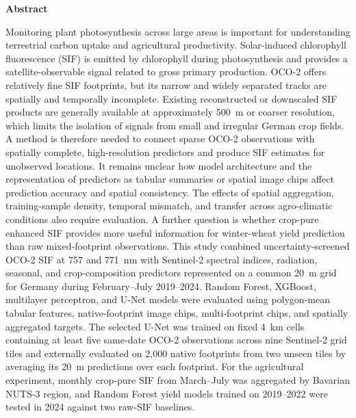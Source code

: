 \thispagestyle{empty}
\vspace*{1.0cm}

\begin{center}
    \textbf{Abstract}
\end{center}

\vspace*{0.5cm}

\noindent
Monitoring plant photosynthesis across large areas is important for understanding terrestrial carbon uptake and agricultural productivity.
Solar-induced chlorophyll fluorescence (SIF) is emitted by chlorophyll during photosynthesis and provides a satellite-observable signal related to gross primary production.
OCO-2 offers relatively fine SIF footprints, but its narrow and widely separated tracks are spatially and temporally incomplete.
Existing reconstructed or downscaled SIF products are generally available at approximately 500~m or coarser resolution, which limits the isolation of signals from small and irregular German crop fields.
A method is therefore needed to connect sparse OCO-2 observations with spatially complete, high-resolution predictors and produce SIF estimates for unobserved locations.
It remains unclear how model architecture and the representation of predictors as tabular summaries or spatial image chips affect prediction accuracy and spatial consistency.
The effects of spatial aggregation, training-sample density, temporal mismatch, and transfer across agro-climatic conditions also require evaluation.
A further question is whether crop-pure enhanced SIF provides more useful information for winter-wheat yield prediction than raw mixed-footprint observations.
This study combined uncertainty-screened OCO-2 SIF at 757 and 771~nm with Sentinel-2 spectral indices, radiation, seasonal, and crop-composition predictors represented on a common 20~m grid for Germany during February--July 2019--2024.
Random Forest, XGBoost, multilayer perceptron, and U-Net models were evaluated using polygon-mean tabular features, native-footprint image chips, multi-footprint chips, and spatially aggregated targets.
The selected U-Net was trained on fixed 4~km cells containing at least five same-date OCO-2 observations across nine Sentinel-2 grid tiles and externally evaluated on 2,000 native footprints from two unseen tiles by averaging its 20~m predictions over each footprint.
For the agricultural experiment, monthly crop-pure SIF from March--July was aggregated by Bavarian NUTS-3 region, and Random Forest yield models trained on 2019--2022 were tested in 2024 against two raw-SIF baselines.
